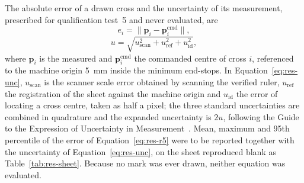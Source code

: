 The absolute error of a drawn cross and the uncertainty of its measurement, prescribed for qualification test~5 and never evaluated, are
\begin{equation}
\label{eq:res-r5}
e_i=\lVert\mathbf{p}_i-\mathbf{p}_i^{\mathrm{cmd}}\rVert,
\end{equation}
\begin{equation}
\label{eq:res-unc}
u=\sqrt{u_{\mathrm{scan}}^2+u_{\mathrm{ref}}^2+u_{\mathrm{id}}^2},
\end{equation}
where $\mathbf{p}_i$ is the measured and $\mathbf{p}_i^{\mathrm{cmd}}$ the commanded centre of cross $i$, referenced to the machine origin 5~mm inside the minimum end-stops.
In Equation~\ref{eq:res-unc}, $u_{\mathrm{scan}}$ is the scanner scale error obtained by scanning the verified ruler, $u_{\mathrm{ref}}$ the registration of the sheet against the machine origin and $u_{\mathrm{id}}$ the error of locating a cross centre, taken as half a pixel; the three standard uncertainties are combined in quadrature and the expanded uncertainty is $2u$, following the Guide to the Expression of Uncertainty in Measurement~\cite[Clause~5]{jcgm2008}.
Mean, maximum and 95th percentile of the error of Equation~\ref{eq:res-r5} were to be reported together with the uncertainty of Equation~\ref{eq:res-unc}, on the sheet reproduced blank as Table~\ref{tab:res-sheet}.
Because no mark was ever drawn, neither equation was evaluated.
